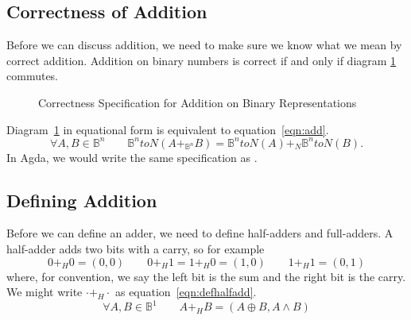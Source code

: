 \documentclass[14pt]{extarticle}  %
\theoremstyle{plain}
\theoremstyle{definition}
\theoremstyle{remark}
\begin{document}
\subsection{Correctness of Addition}
Before we can discuss addition, we need to make sure we know what we mean by correct addition. Addition on binary numbers is correct
if and only if diagram \ref{fig:add} commutes.
\begin{figure}
\centering
\caption{Correctness Specification for Addition on Binary Representations}
\label{fig:add}
\end{figure}
Diagram~\ref{fig:add} in equational form is equivalent to equation~\ref{eqn:add}.
\begin{equation}\label{eqn:add}
  \forall A , B \in \mathbb{B}^{n} \qquad \mathbb{B}^{n}toN(A+_{\mathbb{B}^{n}}B) = \mathbb{B}^{n}toN(A)+_{N}\mathbb{B}^{n}toN(B).
\end{equation}
In Agda, we would write the same specification as .
\subsection{Defining Addition}
Before we can define an adder, we need to define half-adders and full-adders.
A half-adder adds two bits with a carry, so for example
\[0 +_{H} 0 = (0,0) \qquad 0 +_{H} 1 = 1 +_{H} 0 = (1 , 0) \qquad 1 +_{H} 1 = (0 ,1 )\]
where, for convention, we say the left bit is the sum and the right bit is the carry.
We might write $\cdot +_{H}\cdot$ as equation~\ref{eqn:defhalfadd}.
\begin{equation}\label{eqn:defhalfadd}
  \forall A,B\in \mathbb{B}^{1} \qquad A +_{H} B = (A \oplus B , A \land B)
\end{equation}
\end{document}

